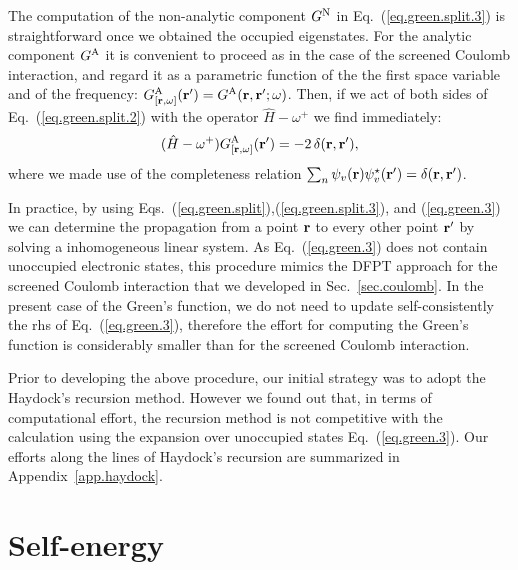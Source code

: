 \documentclass[twocolumn,prb,showpacs,superscriptaddress]{revtex4}
\def\w{\omega}
\def\H{\hat{H}}
\def\r{{\bf r}}
\def\rp{{\bf r^\prime}}
\begin{document}
The computation of the non-analytic component $G^{\rm N}$ in Eq.\ (\ref{eq.green.split.3})
is straightforward once we obtained the occupied eigenstates.
For the analytic component $G^{\rm A}$ it is convenient to
proceed as in the case of the screened Coulomb interaction,
and regard it as a parametric
function of the the first space variable
and of the frequency: $G^{\rm A}_{[\r,\w]}(\rp) = G^{\rm A}(\r,\rp;\w)$.
Then, if we act of both sides of Eq.\ (\ref{eq.green.split.2})
with the operator $\H-\w^+$ we find immediately:
  \begin{equation}\label{eq.green.3}
  (\H-\w^+) G^{\rm A}_{[\r,\w]}(\rp) = -2\, \delta(\r,\rp), 
  \end{equation}
where we made use of the 
completeness relation $\sum_n \psi_v(\r)\psi_v^\star(\rp) = \delta(\r,\rp)$.

In practice, by using Eqs.\ (\ref{eq.green.split}),(\ref{eq.green.split.3}), and
(\ref{eq.green.3}) we can determine the propagation
from a point $\r$ to every other point $\rp$ by solving a inhomogeneous
linear system. As Eq.\ (\ref{eq.green.3}) does not contain unoccupied
electronic states, this procedure mimics the DFPT approach for the
screened Coulomb interaction that we developed in Sec.\ \ref{sec.coulomb}.
In the present case of the Green's function, we do not need to update
self-consistently the rhs of Eq.\ (\ref{eq.green.3}), therefore the
effort for computing the Green's function is considerably smaller
than for the screened Coulomb interaction.

Prior to developing the above procedure, our initial strategy was to adopt 
the Haydock's recursion method.\cite{haydock1}
However we found out that, in terms of computational effort,
the recursion method is not competitive with the calculation using
the expansion over unoccupied states Eq.\ (\ref{eq.green.3}).
Our efforts along the lines of Haydock's recursion are summarized in
Appendix~\ref{app.haydock}.

\section{Self-energy}\label{sec.sigma}
\end{document}
